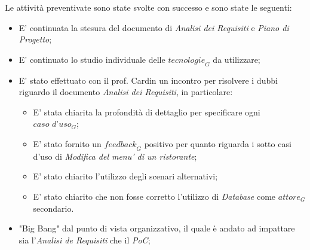 Le attività preventivate sono state svolte con successo e sono state le seguenti:
\begin{itemize}
    \item E' continuata la stesura del documento di \emph{Analisi dei Requisiti} e \emph{Piano di Progetto};
    \item E' continuato lo studio individuale delle $\textit{tecnologie}_G$ da utilizzare;
    \item E' stato effettuato con il prof. Cardin un incontro per risolvere i dubbi riguardo il documento \emph{Analisi dei Requisiti}, in particolare:
    \begin{itemize}
        \item E' stata chiarita la profondità di dettaglio per specificare ogni $\textit{caso d'uso}_G$;
        \item E' stato fornito un $\textit{feedback}_G$ positivo per quanto riguarda i sotto casi d'uso di \emph{Modifica del menu' di un ristorante};
        \item E' stato chiarito l'utilizzo degli scenari alternativi;
        \item E' stato chiarito che non fosse corretto l'utilizzo di \emph{Database} come $\textit{attore}_G$ secondario.
    \end{itemize}
    \item "Big Bang" dal punto di vista organizzativo, il quale è andato ad impattare sia l'\emph{Analisi de Requisiti} che il \emph{PoC};
\end{itemize}
